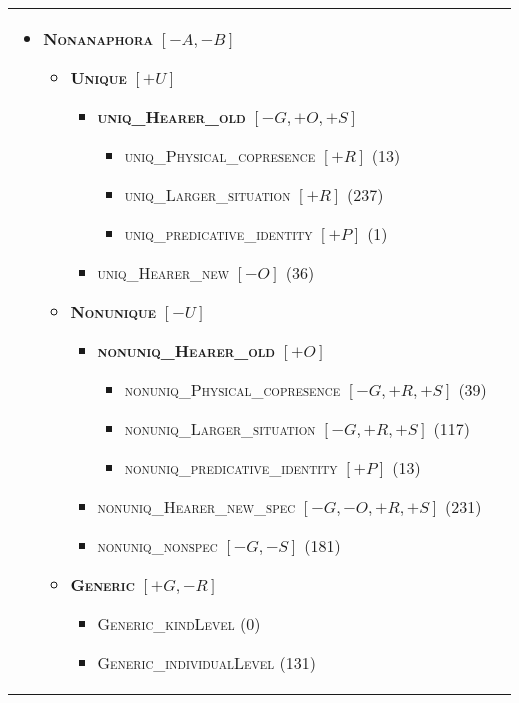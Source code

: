 \documentclass[11pt,letterpaper]{article}
\newcommand{\ilbl}[1]{\mbox{\textbf{\textsc{#1}}}} %
\newcommand{\llbl}[1]{\mbox{\textsc{#1}}} %
\begin{document}
\begin{figure*}[t]\small
\begin{tabular}{p{}p{}}
\begin{itemize}
\item    \ilbl{Nonanaphora} $[-A,-B]$
  \begin{itemize}
  \item      \ilbl{Unique} $[+U]$
    \begin{itemize}
    \item        \ilbl{uniq\_Hearer\_old} $[-G,+O,+S]$
      \begin{itemize}
      \item          \llbl{uniq\_Physical\_copresence} $[+R]$ {\tiny(13)}
      \item          \llbl{uniq\_Larger\_situation} $[+R]$ {\tiny(237)}
      \item          \llbl{uniq\_predicative\_identity} $[+P]$ {\tiny(1)}
      \end{itemize}
    \item        \llbl{uniq\_Hearer\_new} $[-O]$ {\tiny(36)}
    \end{itemize}
   \item     \ilbl{Nonunique} $[-U]$
     \begin{itemize}
     \item       \ilbl{nonuniq\_Hearer\_old} $[+O]$
       \begin{itemize}
       \item         \llbl{nonuniq\_Physical\_copresence} $[-G,+R,+S]$ {\tiny(39)}
       \item         \llbl{nonuniq\_Larger\_situation} $[-G,+R,+S]$ {\tiny(117)}
       \item         \llbl{nonuniq\_predicative\_identity} $[+P]$ {\tiny(13)}
       \end{itemize}
     \item       \llbl{nonuniq\_Hearer\_new\_spec} $[-G,-O,+R,+S]$ {\tiny(231)}
     \item       \llbl{nonuniq\_nonspec} $[-G,-S]$ {\tiny(181)}
     \end{itemize}
   \item \ilbl{Generic} $[+G,-R]$
     \begin{itemize}
	   \item      \llbl{Generic\_kindLevel} {\tiny(0)}
	   \item      \llbl{Generic\_individualLevel} {\tiny(131)}
     \end{itemize}
  \end{itemize}

\end{itemize}
\end{tabular}
\end{figure*}
\end{document}
